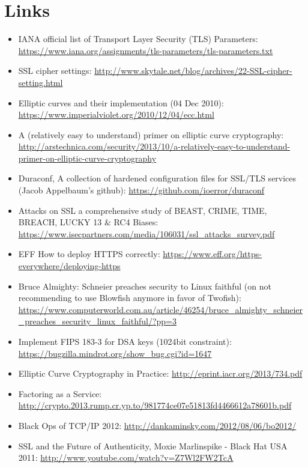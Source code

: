 \chapter{Links}
\label{cha:links}

\begin{itemize}
  \item IANA official list of Transport Layer Security (TLS) Parameters: \url{https://www.iana.org/assignments/tls-parameters/tls-parameters.txt}
  \item SSL cipher settings: \url{http://www.skytale.net/blog/archives/22-SSL-cipher-setting.html}
  \item Elliptic curves and their implementation (04 Dec 2010): \url{https://www.imperialviolet.org/2010/12/04/ecc.html}
  \item A (relatively easy to understand) primer on elliptic curve cryptography: \url{http://arstechnica.com/security/2013/10/a-relatively-easy-to-understand-primer-on-elliptic-curve-cryptography}
  \item Duraconf, A collection of hardened configuration files for SSL/TLS services (Jacob Appelbaum's github): \url{https://github.com/ioerror/duraconf}
  \item Attacks on SSL a comprehensive study of BEAST, CRIME, TIME, BREACH, LUCKY 13 \& RC4 Biases: \url{https://www.isecpartners.com/media/106031/ssl_attacks_survey.pdf}
  \item EFF How to deploy HTTPS correctly: \url{https://www.eff.org/https-everywhere/deploying-https}
  \item Bruce Almighty: Schneier preaches security to Linux faithful (on not recommending to use Blowfish anymore in favor of Twofish): \url{https://www.computerworld.com.au/article/46254/bruce_almighty_schneier_preaches_security_linux_faithful/?pp=3}
  \item Implement FIPS 183-3 for DSA keys (1024bit constraint): \url{https://bugzilla.mindrot.org/show_bug.cgi?id=1647}
  \item Elliptic Curve Cryptography in Practice: \url{http://eprint.iacr.org/2013/734.pdf}
  \item Factoring as a Service: \url{http://crypto.2013.rump.cr.yp.to/981774ce07e51813fd4466612a78601b.pdf}
  \item Black Ops of TCP/IP 2012: \url{http://dankaminsky.com/2012/08/06/bo2012/}
  \item SSL and the Future of Authenticity, Moxie Marlinspike - Black Hat USA 2011: \url{http://www.youtube.com/watch?v=Z7Wl2FW2TcA}

\end{itemize}
